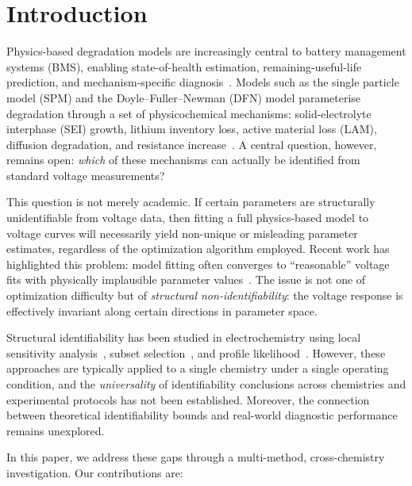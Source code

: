 \documentclass[preprint,12pt]{elsarticle}
\begin{document}
\linenumbers

\section{Introduction}
\label{sec:intro}

Physics-based degradation models are increasingly central to battery management systems (BMS), enabling state-of-health estimation, remaining-useful-life prediction, and mechanism-specific diagnosis~\cite{Birkl2017,Sulzer2019}.
Models such as the single particle model (SPM) and the Doyle--Fuller--Newman (DFN) model parameterise degradation through a set of physicochemical mechanisms: solid-electrolyte interphase (SEI) growth, lithium inventory loss, active material loss (LAM), diffusion degradation, and resistance increase~\cite{Pinson2013,Dai2018}.
A central question, however, remains open: \emph{which} of these mechanisms can actually be identified from standard voltage measurements?

This question is not merely academic.
If certain parameters are structurally unidentifiable from voltage data, then fitting a full physics-based model to voltage curves will necessarily yield non-unique or misleading parameter estimates, regardless of the optimization algorithm employed.
Recent work has highlighted this problem: model fitting often converges to ``reasonable'' voltage fits with physically implausible parameter values~\cite{Srinivasan2001,Zhang2020}.
The issue is not one of optimization difficulty but of \emph{structural non-identifiability}: the voltage response is effectively invariant along certain directions in parameter space.

Structural identifiability has been studied in electrochemistry using local sensitivity analysis~\cite{Ramasamy2009}, subset selection~\cite{Shen2021}, and profile likelihood~\cite{Raue2009}.
However, these approaches are typically applied to a single chemistry under a single operating condition, and the \emph{universality} of identifiability conclusions across chemistries and experimental protocols has not been established.
Moreover, the connection between theoretical identifiability bounds and real-world diagnostic performance remains unexplored.

In this paper, we address these gaps through a multi-method, cross-chemistry investigation.
Our contributions are:
\end{document}
